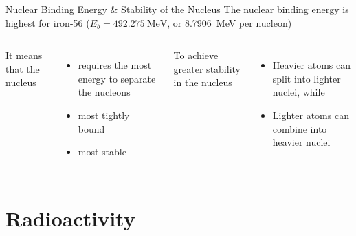 \documentclass[12pt,compress,aspectratio=169]{beamer}
\begin{document}
\begin{frame}{Nuclear Binding Energy \& Stability of the Nucleus}
  The nuclear binding energy is highest for iron-56
  ($E_b=\SI{492.275}{\mega\electronvolt}$, or \SI{8.7906}{\mega\electronvolt}
  per nucleon)

  \vspace{.1in}
  \begin{columns}
 
    It means that the nucleus
    \begin{itemize}
    \item requires the most energy to separate the nucleons
    \item most tightly bound
    \item most stable
    \end{itemize}
    To achieve greater stability in the nucleus
    \begin{itemize}
    \item Heavier atoms can split into lighter nuclei, while
    \item Lighter atoms can combine into heavier nuclei
    \end{itemize}
  \end{columns}
\end{frame}






\section{Radioactivity}

\end{document}
